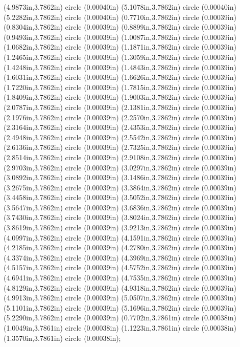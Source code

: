 (4.9873in,3.7862in) circle (0.00040in) (5.1078in,3.7862in) circle (0.00040in) (5.2282in,3.7862in) circle (0.00040in) (0.7710in,3.7862in) circle (0.00039in) (0.8304in,3.7862in) circle (0.00039in) (0.8899in,3.7862in) circle (0.00039in) (0.9493in,3.7862in) circle (0.00039in) (1.0087in,3.7862in) circle (0.00039in) (1.0682in,3.7862in) circle (0.00039in) (1.1871in,3.7862in) circle (0.00039in) (1.2465in,3.7862in) circle (0.00039in) (1.3059in,3.7862in) circle (0.00039in) (1.4248in,3.7862in) circle (0.00039in) (1.4843in,3.7862in) circle (0.00039in) (1.6031in,3.7862in) circle (0.00039in) (1.6626in,3.7862in) circle (0.00039in) (1.7220in,3.7862in) circle (0.00039in) (1.7815in,3.7862in) circle (0.00039in) (1.8409in,3.7862in) circle (0.00039in) (1.9003in,3.7862in) circle (0.00039in) (2.0787in,3.7862in) circle (0.00039in) (2.1381in,3.7862in) circle (0.00039in) (2.1976in,3.7862in) circle (0.00039in) (2.2570in,3.7862in) circle (0.00039in) (2.3164in,3.7862in) circle (0.00039in) (2.4353in,3.7862in) circle (0.00039in) (2.4948in,3.7862in) circle (0.00039in) (2.5542in,3.7862in) circle (0.00039in) (2.6136in,3.7862in) circle (0.00039in) (2.7325in,3.7862in) circle (0.00039in) (2.8514in,3.7862in) circle (0.00039in) (2.9108in,3.7862in) circle (0.00039in) (2.9703in,3.7862in) circle (0.00039in) (3.0297in,3.7862in) circle (0.00039in) (3.0892in,3.7862in) circle (0.00039in) (3.1486in,3.7862in) circle (0.00039in) (3.2675in,3.7862in) circle (0.00039in) (3.3864in,3.7862in) circle (0.00039in) (3.4458in,3.7862in) circle (0.00039in) (3.5052in,3.7862in) circle (0.00039in) (3.5647in,3.7862in) circle (0.00039in) (3.6836in,3.7862in) circle (0.00039in) (3.7430in,3.7862in) circle (0.00039in) (3.8024in,3.7862in) circle (0.00039in) (3.8619in,3.7862in) circle (0.00039in) (3.9213in,3.7862in) circle (0.00039in) (4.0997in,3.7862in) circle (0.00039in) (4.1591in,3.7862in) circle (0.00039in) (4.2185in,3.7862in) circle (0.00039in) (4.2780in,3.7862in) circle (0.00039in) (4.3374in,3.7862in) circle (0.00039in) (4.3969in,3.7862in) circle (0.00039in) (4.5157in,3.7862in) circle (0.00039in) (4.5752in,3.7862in) circle (0.00039in) (4.6941in,3.7862in) circle (0.00039in) (4.7535in,3.7862in) circle (0.00039in) (4.8129in,3.7862in) circle (0.00039in) (4.9318in,3.7862in) circle (0.00039in) (4.9913in,3.7862in) circle (0.00039in) (5.0507in,3.7862in) circle (0.00039in) (5.1101in,3.7862in) circle (0.00039in) (5.1696in,3.7862in) circle (0.00039in) (5.2290in,3.7862in) circle (0.00039in) (0.7702in,3.7861in) circle (0.00038in) (1.0049in,3.7861in) circle (0.00038in) (1.1223in,3.7861in) circle (0.00038in) (1.3570in,3.7861in) circle (0.00038in);
